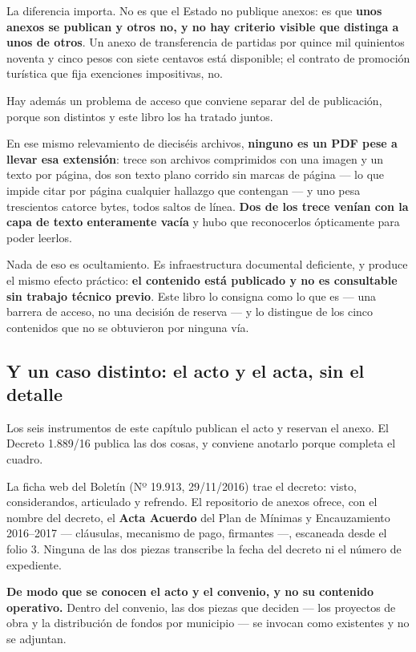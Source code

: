 La diferencia importa. No es que el Estado no publique anexos: es que \textbf{unos anexos se
publican y otros no, y no hay criterio visible que distinga a unos de otros}. Un anexo de
transferencia de partidas por quince mil quinientos noventa y cinco pesos con siete centavos
está disponible; el contrato de promoción turística que fija exenciones impositivas, no.

\begin{cautela}
Hay además un problema de acceso que conviene separar del de publicación, porque son
distintos y este libro los ha tratado juntos.

En ese mismo relevamiento de dieciséis archivos, \textbf{ninguno es un PDF pese a llevar esa
extensión}: trece son archivos comprimidos con una imagen y un texto por página, dos son
texto plano corrido sin marcas de página --- lo que impide citar por página cualquier
hallazgo que contengan --- y uno pesa trescientos catorce bytes, todos saltos de línea.
\textbf{Dos de los trece venían con la capa de texto enteramente vacía} y hubo que
reconocerlos ópticamente para poder leerlos.

Nada de eso es ocultamiento. Es infraestructura documental deficiente, y produce el mismo
efecto práctico: \textbf{el contenido está publicado y no es consultable sin trabajo técnico
previo}. Este libro lo consigna como lo que es --- una barrera de acceso, no una decisión de
reserva --- y lo distingue de los cinco contenidos que no se obtuvieron por ninguna vía.
\end{cautela}

\subsection*{Y un caso distinto: el acto y el acta, sin el detalle}

Los seis instrumentos de este capítulo publican el acto y reservan el anexo. El Decreto
1.889/16 publica las dos cosas, y conviene anotarlo porque completa el cuadro.

La ficha web del Boletín (Nº 19.913, 29/11/2016) trae el decreto: visto, considerandos,
articulado y refrendo. El repositorio de anexos ofrece, con el nombre del decreto, el
\textbf{Acta Acuerdo} del Plan de Mínimas y Encauzamiento 2016--2017 --- cláusulas,
mecanismo de pago, firmantes ---, escaneada desde el folio 3. Ninguna de las dos piezas
transcribe la fecha del decreto ni el número de expediente.

\textbf{De modo que se conocen el acto y el convenio, y no su contenido operativo.} Dentro
del convenio, las dos piezas que deciden --- los proyectos de obra y la distribución de fondos
por municipio --- se invocan como existentes y no se adjuntan.

